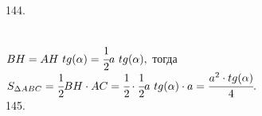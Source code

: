 \documentclass[12pt]{article}
\begin{document}
144. \begin{figure}[ht!]
\end{figure}\\
$BH=AH\ tg(\alpha)=\cfrac{1}{2}a\ tg(\alpha),$ тогда $S_{\Delta ABC}=\cfrac{1}{2}BH\cdot AC=\cfrac{1}{2}\cdot \cfrac{1}{2}a\ tg(\alpha)\cdot a=\cfrac{a^2\cdot tg(\alpha)}{4}.$\\
145. \begin{figure}[ht!]
\end{figure}\\
\end{document}

